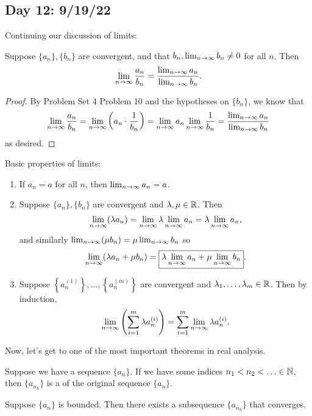 \documentclass[main.tex]{subfiles}
\begin{document}
\subsection{Day 12: 9/19/22}

Continuing our discussion of limits:
\begin{theorem}
    Suppose $\{a_n\}, \{b_n\}$ are convergent, and that $b_n, \lim_{n\to \infty} b_n\neq 0$ for all $n$. Then
    \[\lim_{n\to \infty} \frac{a_n}{b_n} = \frac{\lim_{n\to \infty} a_n}{\lim_{n\to \infty} b_n}.\]
\end{theorem}
\begin{proof}
    By Problem Set 4 Problem 10 and the hypotheses on $\{b_n\}$, we know that
    \[\lim_{n\to \infty} \frac{a_n}{b_n} = \lim_{n\to \infty} \left(a_n \cdot \frac{1}{b_n}\right) = \lim_{n\to \infty} a_n \lim_{n\to \infty} \frac{1}{b_n} = \frac{\lim_{n\to \infty} a_n}{\lim_{n\to \infty} b_n}\]
    as desired.
\end{proof}
Basic properties of limits:
\begin{enumerate}
    \item If $a_n = a$ for all $n$, then $\lim_{n\to \infty} a_n = a$.
    \item Suppose $\{a_n\}, \{b_n\}$ are convergent and $\lambda , \mu\in \mathbb R$. Then 
    \[\lim_{n\to \infty} (\lambda a_n) = \lim_{n\to \infty} \lambda \lim_{n\to \infty} a_n = \lambda \lim_{n\to \infty} a_n,\]
    and similarly $\lim_{n\to \infty} (\mu b_n) = \mu \lim_{n\to \infty} b_n$ so 
    \[\lim_{n\to \infty} (\lambda a_n + \mu b_n) = \boxed{\lambda \lim_{n\to \infty} a_n + \mu \lim_{n\to \infty} b_n}.\]
    \item Suppose $\left\{a_n^{(1)}\right\},\ldots , \left\{a_n^{(m)}\right\}$ are convergent and $\lambda_1, \ldots , \lambda_m\in \mathbb R$. Then by induction,
    \[\lim_{n\to \infty} \left(\sum_{i = 1}^m \lambda a_n^{(i)}\right) = \sum_{i = 1}^m \lim_{n\to \infty} \lambda a_n^{(i)}.\]
\end{enumerate}

Now, let's get to one of the most important theorems in real analysis.

\begin{definition}
    Suppose we have a sequence $\{a_n\}$. If we have some indices $n_1 < n_2 < \ldots \in \mathbb N$, then $\{a_{n_k}\}$ is a  of the original sequence $\{a_n\}$.
\end{definition}

\begin{theorem}
    Suppose $\{a_n\}$ is bounded. Then there exists a subsequence $\{a_{n_k}\}$ that converges.
\end{theorem}
\end{document}
